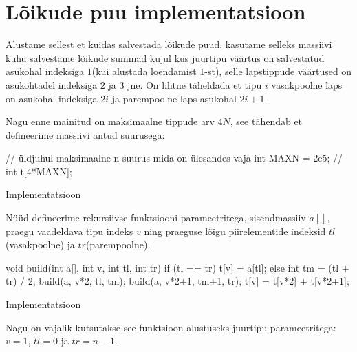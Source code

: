 \documentclass{trkut}
\theoremstyle{definition}
\begin{document}
\section{Lõikude puu implementatsioon}

Alustame sellest et kuidas salvestada lõikude puud, kasutame selleks massiivi kuhu salvestame lõikude summad kujul kus juurtipu väärtus on salvestatud asukohal indeksiga $1$(kui alustada loendamist $1$-st), selle lapstippude väärtused on asukohtadel indeksiga $2$ ja $3$ jne. On lihtne täheldada et tipu $i$ vasakpoolne laps on asukohal indeksiga $2i$ ja parempoolne laps asukohal $2i+1$. \parencite{EMaxx}

Nagu enne mainitud on maksimaalne tippude arv $4N$, see tähendab et defineerime massiivi antud suurusega:
\begin{cclol}
// üldjuhul maksimaalne n suurus mida on ülesandes vaja
int MAXN = 2e5;
//
int t[4*MAXN];
\end{cclol}
\begin{kk}[H]%
    \caption{Implementatsioon}%
    \label{EMaxx}%
    \end{kk}
Nüüd defineerime rekursiivse funktsiooni parameetritega, sisendmassiiv $a[]$, praegu vaadeldava tipu indeks $v$ ning praeguse lõigu piirelementide indeksid $tl$(vasakpoolne) ja $tr$(parempoolne).
\begin{cclol}
void build(int a[], int v, int tl, int tr) {
    if (tl == tr) {
        t[v] = a[tl];
    } else {
        int tm = (tl + tr) / 2;
        build(a, v*2, tl, tm);
        build(a, v*2+1, tm+1, tr);
        t[v] = t[v*2] + t[v*2+1];
    }
}
\end{cclol}
 \begin{kk}[H]%
    \caption{Implementatsioon}%
    \label{EMaxx}%
    \end{kk}
Nagu on vajalik kutsutakse see funktsioon alustuseks juurtipu parameetritega: $v=1$, $tl=0$ ja $tr=n-1$.
\end{document}
